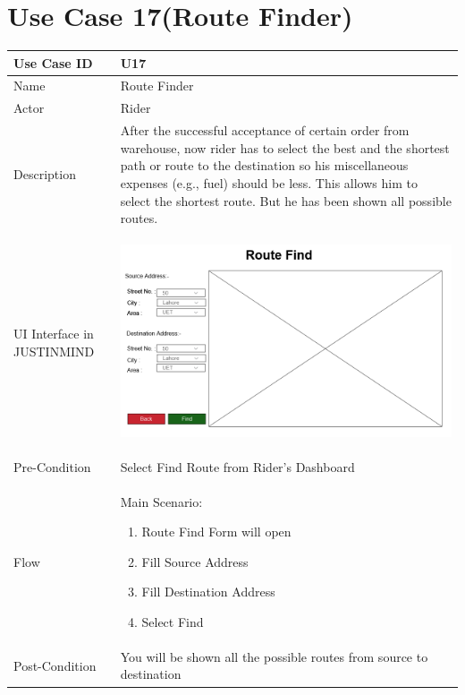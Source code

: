 \documentclass[12pt,a4paper]{report}
\begin{document}
\section{ Use Case 17(Route Finder)}

\begin{tabular}{ | m{3cm} | m{12cm}| } \hline

Use Case ID &  U17 \\\hline

Name  	    & Route Finder  \\ \hline

Actor     	& Rider \\ \hline

Description & After the successful acceptance of certain order from warehouse, now rider has to select the best and the shortest path or route to the destination so his miscellaneous expenses (e.g., fuel) should be less. This allows him to select the shortest route. But he has been shown all possible routes.   \\ \hline

UI Interface in JUSTINMIND & \begin{center} \includegraphics[scale=0.3]{./UIs for Latex Reports/UI-024 Route Finder@1x.png}\end{center}  \\ \hline

Pre-Condition &  Select Find Route from Rider’s Dashboard \\ \hline

Flow & Main Scenario:

\begin{enumerate}
\item   Route Find Form will open
\item   Fill Source Address
\item   Fill Destination Address
\item   Select Find


\end{enumerate}
\\ \hline
Post-Condition &  You will be shown all the possible routes from source to destination   \\ \hline

\end{tabular}
\end{document}
